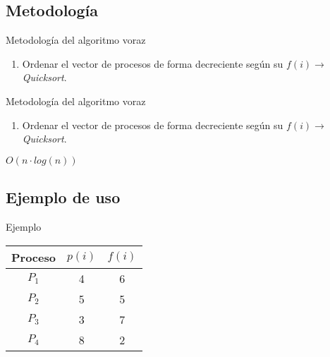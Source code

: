 \documentclass{beamer}
\begin{document}
\subsection{Metodología}
\begin{frame}[fragile]{Metodología del algoritmo voraz}
\begin{enumerate}
	\item Ordenar el vector de procesos de forma decreciente según su $f(i)\rightarrow $ \emph{Quicksort}.
\end{enumerate}
\end{frame}

\begin{frame}[fragile]{Metodología del algoritmo voraz}
\begin{enumerate}
	\item Ordenar el vector de procesos de forma decreciente según su $f(i)\rightarrow $ \emph{Quicksort}.
\end{enumerate}
\vspace{2cm}
\Huge{$O(n\cdot log(n))$}
\end{frame}

\subsection{Ejemplo de uso}

\begin{frame}[fragile]{Ejemplo}
\begin{table}
\begin{tabular}{|c|c|c|}
\hline
\textbf{Proceso} & \textbf{$p(i)$} & \textbf{$f(i)$} \\
\hline
$P_1$ & 4 & 6 \\
\hline
$P_2$ & 5 & 5 \\
\hline
$P_3$ & 3 & 7 \\
\hline
$P_4$ & 8 & 2 \\
\hline
\end{tabular}
\end{table}
\end{frame}
\end{document}
